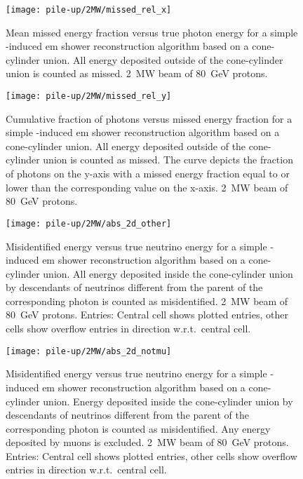 \begin{figure}[tbp]
	\centering
	\texttt{[image: pile-up/2MW/missed\_rel\_x]}
	\caption[Pile-up study mean missed fractional vs.\ true photon energy, \SI{2}{\mega\watt} beam]{%
		Mean missed energy fraction versus true photon energy for a simple \Pgpz-induced \acrshort{em} shower reconstruction algorithm based on a cone-cylinder union.
		All energy deposited outside of the cone-cylinder union is counted as missed.
		\SI{2}{\mega\watt} beam of \SI{80}{\giga\electronvolt} protons.
	}
\end{figure}

\begin{figure}[tbp]
	\centering
	\texttt{[image: pile-up/2MW/missed\_rel\_y]}
	\caption[Pile-up study photon vs.\ missed energy fraction, \SI{2}{\mega\watt} beam]{%
		Cumulative fraction of photons versus missed energy fraction for a simple \Pgpz-induced \acrshort{em} shower reconstruction algorithm based on a cone-cylinder union.
		All energy deposited outside of the cone-cylinder union is counted as missed.
		The curve depicts the fraction of photons on the y-axis with a missed energy fraction equal to or lower than the corresponding value on the x-axis.
		\SI{2}{\mega\watt} beam of \SI{80}{\giga\electronvolt} protons.
	}
\end{figure}

\begin{figure}[tbp]
	\centering
	\texttt{[image: pile-up/2MW/abs\_2d\_other]}
	\caption[Pile-up study misidentified vs.\ true neutrino energy, \SI{2}{\mega\watt} beam]{%
		Misidentified energy versus true neutrino energy for a simple \Pgpz-induced \acrshort{em} shower reconstruction algorithm based on a cone-cylinder union.
		All energy deposited inside the cone-cylinder union by descendants of neutrinos different from the parent of the corresponding \Pgpz photon is counted as misidentified.
		\SI{2}{\mega\watt} beam of \SI{80}{\giga\electronvolt} protons.
		Entries: Central cell shows plotted entries, other cells show overflow entries in direction w.r.t.\ central cell.
	}
\end{figure}

\begin{figure}[tbp]
	\centering
	\texttt{[image: pile-up/2MW/abs\_2d\_notmu]}
	\caption[Pile-up study misidentified vs.\ true neutrino energy, no muons, \SI{2}{\mega\watt} beam]{%
		Misidentified energy versus true neutrino energy for a simple \Pgpz-induced \acrshort{em} shower reconstruction algorithm based on a cone-cylinder union.
		Energy deposited inside the cone-cylinder union by descendants of neutrinos different from the parent of the corresponding \Pgpz photon is counted as misidentified.
		Any energy deposited by muons is excluded.
		\SI{2}{\mega\watt} beam of \SI{80}{\giga\electronvolt} protons.
		Entries: Central cell shows plotted entries, other cells show overflow entries in direction w.r.t.\ central cell.
	}
\end{figure}

